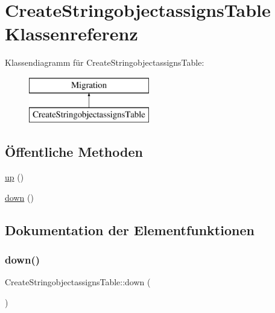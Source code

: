 \hypertarget{classCreateStringobjectassignsTable}{}\section{Create\+Stringobjectassigns\+Table Klassenreferenz}
\label{classCreateStringobjectassignsTable}
Klassendiagramm für Create\+Stringobjectassigns\+Table\+:\begin{figure}[H]
\begin{center}
\leavevmode
\includegraphics[height=2.000000cm]{df/d72/classCreateStringobjectassignsTable}
\end{center}
\end{figure}
\subsection*{Öffentliche Methoden}
\begin{DoxyCompactItemize}
\item 
\hyperlink{classCreateStringobjectassignsTable_ab15ff0c19cc2f4d9dc8041b0136d4a3e}{up} ()
\item 
\hyperlink{classCreateStringobjectassignsTable_a151b212be620a567f8e84de61e745f58}{down} ()
\end{DoxyCompactItemize}


\subsection{Dokumentation der Elementfunktionen}
\mbox{\label{classCreateStringobjectassignsTable_a151b212be620a567f8e84de61e745f58}} 
\subsubsection{\texorpdfstring{down()}{down()}}
{\footnotesize\ttfamily Create\+Stringobjectassigns\+Table\+::down (\begin{DoxyParamCaption}{ }\end{DoxyParamCaption})}

